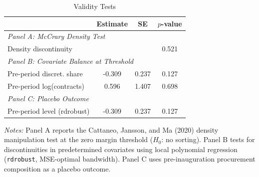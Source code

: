 \begin{table}[t]
\centering
\begin{threeparttable}
\caption{Validity Tests}
\label{tab:validity}
\begin{tabular}{lccc}
\hline\hline
 & Estimate & SE & $p$-value \\
\hline
\multicolumn{4}{l}{\textit{Panel A: McCrary Density Test}} \\
Density discontinuity & & & 0.521 \\
\hline
\multicolumn{4}{l}{\textit{Panel B: Covariate Balance at Threshold}} \\
Pre-period discret. share & -0.309 & 0.237 & 0.127 \\
Pre-period log(contracts) & 0.596 & 1.407 & 0.698 \\
\hline
\multicolumn{4}{l}{\textit{Panel C: Placebo Outcome}} \\
Pre-period level (rdrobust) & -0.309 & 0.237 & 0.127 \\
\hline\hline
\end{tabular}
\begin{tablenotes}[flushleft]
\item \textit{Notes:} Panel A reports the Cattaneo, Jansson, and Ma (2020) density manipulation test at the zero margin threshold ($H_0$: no sorting). Panel B tests for discontinuities in predetermined covariates using local polynomial regression (\texttt{rdrobust}, MSE-optimal bandwidth). Panel C uses pre-inauguration procurement composition as a placebo outcome.
\end{tablenotes}
\end{threeparttable}
\end{table}

